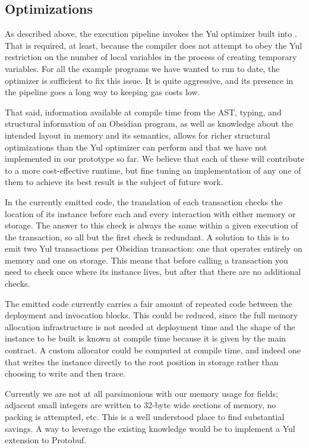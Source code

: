 \subsection{Optimizations}

As described above, the execution pipeline invokes the Yul optimizer built
into \solc. That is required, at least, because the compiler does not
attempt to obey the Yul restriction on the number of local variables in the
process of creating temporary variables. For all the example programs we
have wanted to run to date, the optimizer is sufficient to fix this
issue. It is quite aggressive, and its presence in the pipeline goes a long
way to keeping gas costs low.

That said, information available at compile time from the AST, typing, and
structural information of an Obsidian program, as well as knowledge about
the intended layout in memory and its semantics, allows for richer
structural optimizations than the Yul optimizer can perform and that we
have not implemented in our prototype so far. We believe that each of these
will contribute to a more cost-effective runtime, but fine tuning an
implementation of any one of them to achieve its best result is the subject
of future work.

In the currently emitted code, the translation of each transaction checks
the location of its instance before each and every interaction with either
memory or storage. The answer to this check is always the same within a
given execution of the transaction, so all but the first check is
redundant. A solution to this is to emit two Yul transactions per Obsidian
transaction: one that operates entirely on memory and one on storage. This
means that before calling a transaction you need to check once where its
instance lives, but after that there are no additional checks.

The emitted code currently carries a fair amount of repeated code between
the deployment and invocation blocks. This could be reduced, since the full
memory allocation infrastructure is not needed at deployment time and the
shape of the instance to be built is known at compile time because it is
given by the main contract. A custom allocator could be computed at compile
time, and indeed one that writes the instance directly to the root position
in storage rather than choosing to write and then trace.

Currently we are not at all parsimonious with our memory usage for fields;
adjacent small integers are written to 32-byte wide sections of memory, no
packing is attempted, etc. This is a well understood place to find
substantial savings. A way to leverage the existing knowledge would be to
implement a Yul extension to Protobuf. \cite{TODO}

